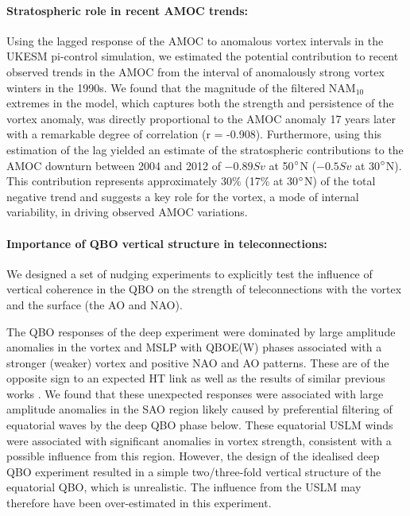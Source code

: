 \paragraph{Stratospheric role in recent AMOC trends:}
Using the lagged response of the AMOC to anomalous vortex intervals in the UKESM pi-control simulation, we estimated the potential contribution to recent observed trends in the AMOC from the interval of anomalously strong vortex winters in the 1990s. We found that the magnitude of the filtered NAM$_{10}$ extremes in the model, which captures both the strength and persistence of the vortex anomaly, was directly proportional to the AMOC anomaly 17 years later with a remarkable degree of correlation (r = -0.908). Furthermore, using this estimation of the lag yielded an estimate of the stratospheric contributions to the AMOC downturn between 2004 and 2012 of $-0.89Sv$ at 50$\degree$N ($-0.5Sv$ at 30$\degree$N). This contribution represents approximately 30\% (17\% at 30$\degree$N) of the total negative trend and suggests a key role for the vortex, a mode of internal variability, in driving observed AMOC variations. 

\paragraph{Importance of QBO vertical structure in teleconnections:}
We designed a set of nudging experiments to explicitly test the influence of vertical coherence in the QBO on the strength of teleconnections with the vortex and the surface (the AO and NAO).

The QBO responses of the deep experiment were dominated by large amplitude anomalies in the vortex and MSLP with QBOE(W) phases associated with a stronger (weaker) vortex and positive NAO and AO patterns. These are of the opposite sign to an expected HT link as well as the results of similar previous works \citep{graySurface2018b, andrewsObserved2019d}. We found that these unexpected responses were associated with large amplitude anomalies in the SAO region likely caused by preferential filtering of equatorial waves by the deep QBO phase below. These equatorial USLM winds were associated with significant anomalies in vortex strength, consistent with a possible influence from this region. However, the design of the idealised deep QBO experiment resulted in a simple two/three-fold vertical structure of the equatorial QBO, which is unrealistic. The influence from the USLM may therefore have been over-estimated in this experiment.


